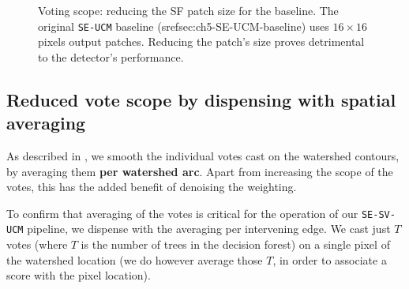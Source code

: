 \begin{figure}[t]
\centering
\caption[Voting scope: reducing the SF patch size - plots]{Voting scope: reducing the SF patch size for the baseline. The original {\tt SE-UCM} baseline (sref{sec:ch5-SE-UCM-baseline}) uses $16\times16$ pixels output patches. Reducing the patch's size proves detrimental to %
the detector's performance.}
\label{fig:degraded-baseline}
\end{figure}

\subsection{Reduced vote scope by dispensing with spatial averaging}
\label{sec:ch5-reduced-vote-scope}
As described in , we smooth %
the individual votes cast on the watershed contours, by averaging them {\bf per watershed arc}. Apart from increasing the scope of the votes, this has the added benefit of denoising the weighting. 

To confirm %
that averaging of the votes is critical for the operation %
of our {\tt SE-SV-UCM} pipeline, we dispense with the averaging per intervening edge. We cast just $T$ votes (where $T$ is the number of trees in the decision forest) on a single pixel of the watershed location (we do however average those $T$, in order to associate a score with the pixel location). 

